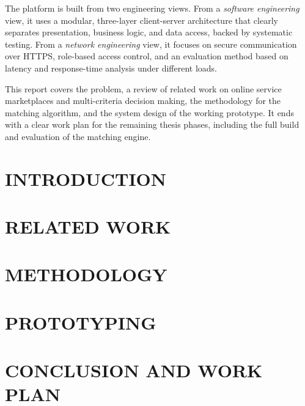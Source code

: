 \documentclass[12pt, twoside]{report}
\begin{document}
The platform is built from two engineering views. From a \textit{software
engineering} view, it uses a modular, three-layer client-server architecture
that clearly separates presentation, business logic, and data access, backed
by systematic testing. From a \textit{network engineering} view, it focuses
on secure communication over HTTPS, role-based access control, and an
evaluation method based on latency and response-time analysis under different
loads.

This report covers the problem, a review of related work on online service
marketplaces and multi-criteria decision making, the methodology for the
matching algorithm, and the system design of the working prototype. It ends
with a clear work plan for the remaining thesis phases, including the full
build and evaluation of the matching engine.

\chapter{INTRODUCTION}
\setcounter{page}{1}


\chapter{RELATED WORK}


\chapter{METHODOLOGY}


\chapter{PROTOTYPING}


\chapter{CONCLUSION AND WORK PLAN}




\end{document}
